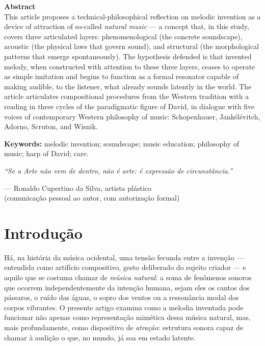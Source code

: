 \documentclass[12pt,a4paper]{article}
\begin{document}
\noindent\textbf{Abstract}\\[0.5em]
{\small\noindent This article proposes a technical-philosophical reflection on melodic invention as a device of attraction of so-called \textit{natural music} --- a concept that, in this study, covers three articulated layers: phenomenological (the concrete soundscape), acoustic (the physical laws that govern sound), and structural (the morphological patterns that emerge spontaneously). The hypothesis defended is that invented melody, when constructed with attention to these three layers, ceases to operate as simple imitation and begins to function as a formal resonator capable of making audible, to the listener, what already sounds latently in the world. The article articulates compositional procedures from the Western tradition with a reading in three cycles of the paradigmatic figure of David, in dialogue with five voices of contemporary Western philosophy of music: Schopenhauer, Jankélévitch, Adorno, Scruton, and Wisnik.}

\vspace{0.5em}
\noindent\textbf{Keywords:} melodic invention; soundscape; music education; philosophy of music; harp of David; care.

\vspace{1.5em}

\begin{flushright}
\begin{minipage}{0.65\textwidth}
\itshape\small
``Se a Arte não vem de dentro, não é arte: é expressão de circunstância.''

\upshape\rmfamily\normalsize\flushright
--- Ronaldo Cupertino da Silva, artista plástico\\
(comunicação pessoal ao autor, com autorização formal)
\end{minipage}
\end{flushright}

\vspace{1em}

\section{Introdução}

Há, na história da música ocidental, uma tensão fecunda entre a invenção --- entendida como artifício compositivo, gesto deliberado do sujeito criador --- e aquilo que se costuma chamar de \textit{música natural}: a soma de fenômenos sonoros que ocorrem independentemente da intenção humana, sejam eles os cantos dos pássaros, o ruído das águas, o sopro dos ventos ou a ressonância modal dos corpos vibrantes. O presente artigo examina como a melodia inventada pode funcionar não apenas como representação mimética dessa música natural, mas, mais profundamente, como dispositivo de \textit{atração}: estrutura sonora capaz de chamar à audição o que, no mundo, já soa em estado latente.
\end{document}
